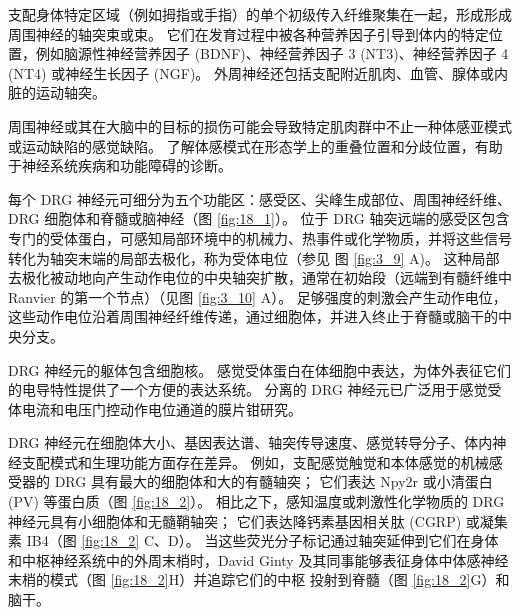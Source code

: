 支配身体特定区域（例如拇指或手指）的单个初级传入纤维聚集在一起，形成形成周围神经的轴突束或束。 它们在发育过程中被各种营养因子引导到体内的特定位置，例如脑源性神经营养因子 (BDNF)、神经营养因子 3 (NT3)、神经营养因子 4 (NT4) 或神经生长因子 (NGF)。 
外周神经还包括支配附近肌肉、血管、腺体或内脏的运动轴突。


周围神经或其在大脑中的目标的损伤可能会导致特定肌肉群中不止一种体感亚模式或运动缺陷的感觉缺陷。 
了解体感模式在形态学上的重叠位置和分歧位置，有助于神经系统疾病和功能障碍的诊断。


每个 DRG 神经元可细分为五个功能区：感受区、尖峰生成部位、周围神经纤维、DRG 细胞体和脊髓或脑神经（图 \ref{fig:18_1}）。 
位于 DRG 轴突远端的感受区包含专门的受体蛋白，可感知局部环境中的机械力、热事件或化学物质，并将这些信号转化为轴突末端的局部去极化，称为受体电位（参见 图 \ref{fig:3_9} A)。 
这种局部去极化被动地向产生动作电位的中央轴突扩散，通常在初始段（远端到有髓纤维中 Ranvier 的第一个节点）（见图 \ref{fig:3_10} A）。 
足够强度的刺激会产生动作电位，这些动作电位沿着周围神经纤维传递，通过细胞体，并进入终止于脊髓或脑干的中央分支。


DRG 神经元的躯体包含细胞核。 
感觉受体蛋白在体细胞中表达，为体外表征它们的电导特性提供了一个方便的表达系统。 
分离的 DRG 神经元已广泛用于感觉受体电流和电压门控动作电位通道的膜片钳研究。


DRG 神经元在细胞体大小、基因表达谱、轴突传导速度、感觉转导分子、体内神经支配模式和生理功能方面存在差异。 
例如，支配感觉触觉和本体感觉的机械感受器的 DRG 具有最大的细胞体和大的有髓轴突； 它们表达 Npy2r 或小清蛋白 (PV) 等蛋白质（图 \ref{fig:18_2}）。 
相比之下，感知温度或刺激性化学物质的 DRG 神经元具有小细胞体和无髓鞘轴突； 它们表达降钙素基因相关肽 (CGRP) 或凝集素 IB4（图 \ref{fig:18_2} C、D）。 
当这些荧光分子标记通过轴突延伸到它们在身体和中枢神经系统中的外周末梢时，David Ginty 及其同事能够表征身体中体感神经末梢的模式（图 \ref{fig:18_2}H）并追踪它们的中枢 投射到脊髓（图 \ref{fig:18_2}G）和脑干。

